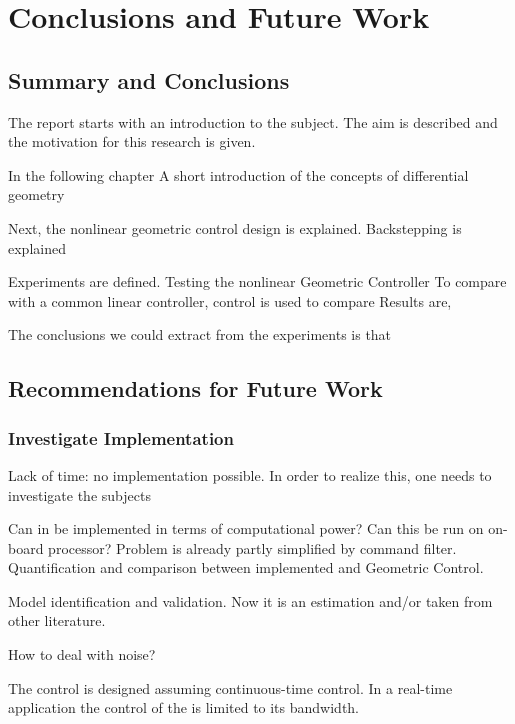 \chapter{Conclusions and Future Work}\label{ch:conclusion}

\section{Summary and Conclusions}
The report starts with an introduction to the subject.
The aim is described and the motivation for this research is given.

In the following chapter
A short introduction of the concepts of differential geometry

Next, the nonlinear geometric control design is explained.
Backstepping is explained

Experiments are defined.
Testing the nonlinear Geometric Controller
To compare with a common linear controller,  control is used to compare
Results are,

The conclusions we could extract from the experiments is that

\section{Recommendations for Future Work}\label{ch:future}

\subsection{Investigate Implementation}
Lack of time: no implementation possible. 
In order to realize this, one needs to investigate the subjects

Can in be implemented in terms of computational power? Can this be run on on-board processor?
Problem is already partly simplified by command filter. Quantification and comparison between implemented  and Geometric Control.

Model identification and validation. Now it is an estimation and/or taken from other literature.

How to deal with noise?

The control is designed assuming continuous-time control. In a real-time application the control of the  is limited to its bandwidth. 


